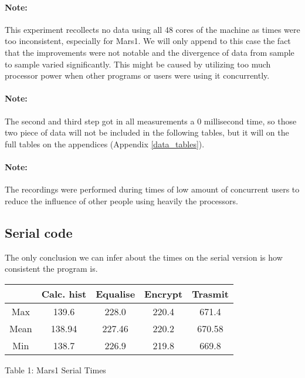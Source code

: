 \documentclass[12pt]{article}
\begin{document}
\paragraph{Note:}
This experiment recollects no data using all 48 cores of the machine as times were too inconsistent, especially for Mars1. We will only append to this case the fact that the improvements were not notable and the divergence of data from sample to sample varied significantly. This might be caused by utilizing too much processor power when other programs or users were using it concurrently.

\paragraph{Note:}
The second and third step got in all measurements a 0 millisecond time, so those two piece of data will not be included in the following tables, but it will on the full tables on the appendices (Appendix \ref{data_tables}).

\paragraph{Note:}
The recordings were performed during times of low amount of concurrent users to reduce the influence of other people using heavily the processors.

\subsection{Serial code}

The only conclusion we can infer about the times on the serial version is how consistent the program is.\\

\begin{center}

\begin{tabular}{|c|c|c|c|c|}
																	\hline
			&Calc. hist	&Equalise	&	Encrypt	&	Trasmit		\\	\hline
	Max		&	139.6	&	228.0	&	220.4	&	671.4		\\	\hline
	Mean	&	138.94	&	227.46	&	220.2	&	670.58		\\	\hline
	Min		&	138.7	&	226.9	&	219.8	&	669.8		\\	\hline
\end{tabular}

\vspace{0.3cm}
Table 1: Mars1 Serial Times
\end{center}
\end{document}
